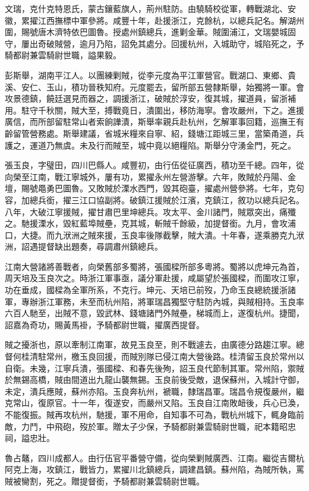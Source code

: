 \begin{pinyinscope}
文瑞，克什克特恩氏，蒙古鑲藍旗人，荊州駐防。由驍騎校從軍，轉戰湖北、安徽，累擢江西撫標中軍參將。咸豐十年，赴援浙江，克餘杭，以總兵記名。解湖州圍，賜號唐木濟特依巴圖魯。授處州鎮總兵，進剿金華。賊圍浦江，文瑞嬰城固守，屢出奇破賊營，逾月乃陷，詔免其處分。回援杭州，入城助守，城陷死之，予騎都尉兼雲騎尉世職，謚果毅。

彭斯舉，湖南平江人。以團練剿賊，從李元度為平江軍營官。戰湖口、東鄉、貴溪、安仁、玉山，積功晉秩知府。元度罷去，留所部五營隸斯舉，始獨將一軍。會攻景德鎮，饒廷選見而器之，調援浙江，破賊於淳安，復其城，擢道員，留浙補用。駐守千秋關，賊大至，搏戰竟日，潰圍出，移防海寧。會攻嚴州，下之。進援廣信，而所部留駐常山者索餉譁潰，斯舉率親兵赴杭州，乞解軍事回籍，巡撫王有齡留管營務處。斯舉建議，省城米糧來自寧、紹，錢塘江距城三里，當築甬道，兵護之，運道乃無虞。未及行而賊至，城中竟以絕糧陷。斯舉分守湧金門，死之。

張玉良，字璧田，四川巴縣人。咸豐初，由行伍從征廣西，積功至千總。四年，從向榮至江南，戰江寧城外，屢有功，累擢永州左營游擊。六年，敗賊於丹陽、金壇，賜號黽勇巴圖魯。又敗賊於溧水西門，毀其砲臺，擢處州營參將。七年，克句容，加總兵銜，擢三江口協副將。破鎮江援賊於江濱，克鎮江，敘功以總兵記名。八年，大破江寧援賊，擢甘肅巴里坤總兵。攻太平、金川諸門，賊眾突出，痛殲之。馳援溧水，毀紅藍埠賊壘，克其城，斬賊千餘級，加提督銜。九月，會攻浦口，大捷。而九洑洲之賊來援，玉良率後隊截擊，賊大潰。十年春，遂乘勝克九洑洲，詔遇提督缺出題奏，尋調肅州鎮總兵。

江南大營諸將善戰者，向榮舊部多蜀將，張國樑所部多粵將。蜀將以虎坤元為首，周天培及玉良次之。時浙江軍事亟，議分軍赴援，咸屬望於張國樑，而圍攻江寧，功在垂成，國樑為全軍所系，不克行。坤元、天培已前歿，乃命玉良總統援浙諸軍，專辦浙江軍務，未至而杭州陷，將軍瑞昌獨堅守駐防內城，與賊相持。玉良率六百人馳至，出賊不意，毀武林、錢塘諸門外賊壘，梯城而上，遂復杭州。捷聞，詔嘉為奇功，賜黃馬褂，予騎都尉世職，擢廣西提督。

賊之擾浙也，原以牽制江南軍，故見玉良至，則不戰遽去，由廣德分路趨江寧。總督何桂清駐常州，檄玉良回援，而賊別隊已侵江南大營後路。桂清留玉良於常州以自衛。未幾，江寧兵潰，張國樑、和春先後殉，詔玉良代節制其軍。常州陷，禦賊於無錫高橋，賊由間道出九龍山襲無錫。玉良前後受敵，退保蘇州，入城計守御，未定，潰兵應賊，蘇州亦陷。玉良奔杭州，褫職，隸瑞昌軍。瑞昌令規復嚴州，繼克常山，復原官。十一年，復遂安，而嚴州又陷。玉良自江南敗衄後，兵心已渙，不能復振。賊再攻杭州，馳援，軍不用命，自知事不可為，戰杭州城下，輒身臨前敵，力鬥，中飛砲，歿於軍。贈太子少保，予騎都尉兼雲騎尉世職，祀本籍昭忠祠，謚忠壯。

魯占鼇，四川成都人。由行伍官平番營守備，從向榮剿賊廣西、江南。繼從吉爾杭阿克上海，攻鎮江，戰皆力，累擢川北鎮總兵，調建昌鎮。蘇州陷，為賊所執，罵賊被臠割，死之。贈提督銜，予騎都尉兼雲騎尉世職。


\end{pinyinscope}
